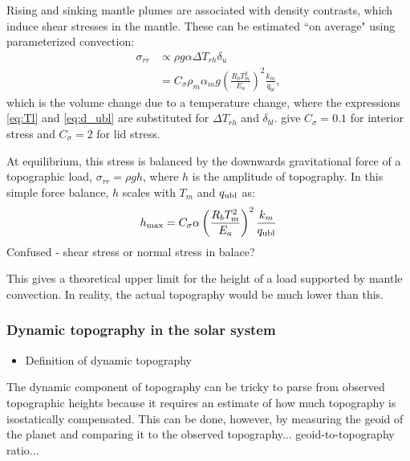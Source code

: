 Rising and sinking mantle plumes are associated with density contrasts, which induce shear stresses in the mantle. These can be estimated ``on average" using parameterized convection:
\begin{align}
\sigma_{rr} &\propto \rho g \alpha \Delta T_{rh} \delta_u \\
&= C_\sigma \rho_m \alpha_m g \left(\frac{R_b T_m^2}{E_a}\right)^2 \frac{k_m}{q_{bl}},
\end{align}
which is the volume change due to a temperature change, where the expressions \ref{eq:Tl} and \ref{eq:d_ubl} are substituted for $\Delta T_{rh}$ and $\delta_{bl}$. \citet{Reese2005} give $C_\sigma = 0.1$ for interior stress and $C_\sigma = 2$ for lid stress.

At equilibrium, this stress is balanced by the downwards gravitational force of a topographic load, $\sigma_{rr} = \rho g h$, where $h$ is the amplitude of topography. In this simple force balance, $h$ scales with $T_m$ and $q_{\rm ubl}$ as:
\begin{equation}
h_{\rm max} = C_\sigma \alpha \left(\frac{R_b T_m^2}{E_a}\right)^2 \frac{k_m}{q_{\rm ubl}}
\end{equation}
Confused - shear stress or normal stress in balace?

This gives a theoretical upper limit for the height of a load supported by mantle convection. In reality, the actual topography would be much lower than this.



\subsubsection{Dynamic topography in the solar system}

\begin{itemize}
\item Definition of dynamic topography
\end{itemize}

The dynamic component of topography can be tricky to parse from observed topographic heights because it requires an estimate of how much topography is isostatically compensated. This can be done, however, by measuring the geoid of the planet and comparing it to the observed topography... geoid-to-topography ratio...

